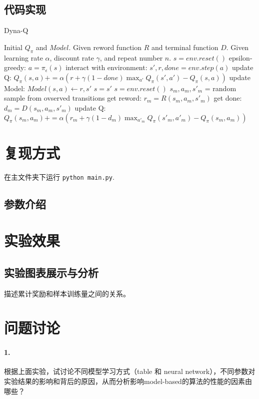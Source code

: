 \documentclass[a4paper,12pt]{article}
\begin{document}
\begin{CJK}{UTF8}{gbsn}
\subsection{代码实现}
\begin{algorithm}[!h]
	\caption{Dyna-Q}
	\begin{algorithmic}[1]
		\STATE Initial $Q_\pi$ and $Model$. Given reword function $R$ and terminal function $D$. Given learning rate $\alpha$, discount rate $\gamma$, and repeat number $n$.
		\STATE $s=env.reset()$
		\STATE  epsilon-greedy: $a=\pi_\epsilon(s)$
		\STATE interact with environment: $s',r,done=env.step(a)$
		\STATE update Q: $Q_\pi(s,a)+=\alpha(r+\gamma(1-done)\max_{a'} Q_\pi(s',a')-Q_\pi(s,a))$
		\STATE update Model: $Model(s,a)\leftarrow r,s'$
		\STATE $s=s'$
		\STATE $s=env.reset()$
		\ENDIF
		\ENDFOR
		\STATE $s_m,a_m,s'_m$ = random sample from ovserved transitions
		\STATE get reword: $r_m=R(s_m,a_m,s'_m)$
		\STATE get done: $d_m=D(s_m,a_m,s'_m)$
		\STATE update Q: $Q_\pi(s_m,a_m)+=\alpha(r_m+\gamma (1-d_m)\max_{a'_m} Q_\pi(s'_m,a'_m)-Q_\pi(s_m,a_m))$
		\ENDFOR
		\ENDFOR
	\end{algorithmic}
\end{algorithm}

\section{复现方式}
在主文件夹下运行 \texttt{python main.py}.
\subsection{参数介绍}
\section{实验效果}
\subsection{实验图表展示与分析}
描述累计奖励和样本训练量之间的关系。
\section{问题讨论}
\paragraph{1.}根据上面实验，试讨论不同模型学习方式（table 和 neural network），不同参数对实验结果的影响和背后的原因，从而分析影响model-based的算法的性能的因素由哪些？



\end{CJK}
\end{document}
